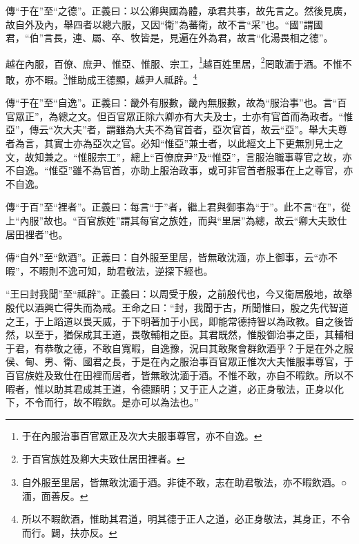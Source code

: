 {\noindent\zhuan{}\fzbyks 傳“于在”至“之德”。正義曰：以公卿與國為體，承君共事，故先言之。然後見廣，故自外及內，舉四者以總六服，又因“衛”為蕃衛，故不言“采”也。“國”謂國君，“伯”言長，連、屬、卒、牧皆是，見遍在外為君，故言“化湯畏相之德”。 \par}

越在內服，百僚、庶尹、惟亞、惟服、宗工，\footnote{于在內服治事百官眾正及次大夫服事尊官，亦不自逸。}越百姓里居，\footnote{于百官族姓及卿大夫致仕居田裡者。}罔敢湎于酒。不惟不敢，亦不暇。\footnote{自外服至里居，皆無敢沈湎于酒。非徒不敢，志在助君敬法，亦不暇飲酒。○湎，面善反。}惟助成王德顯，越尹人祗辟。\footnote{所以不暇飲酒，惟助其君道，明其德于正人之道，必正身敬法，其身正，不令而行。闢，扶亦反。}

{\noindent\zhuan{}\fzbyks 傳“于在”至“自逸”。正義曰：畿外有服數，畿內無服數，故為“服治事”也。言“百官眾正”，為總之文。但百官眾正除六卿亦有大夫及士，士亦有官首而為政者。“惟亞”，傳云“次大夫”者，謂雖為大夫不為官首者，亞次官首，故云“亞”。舉大夫尊者為言，其實士亦為亞次之官。必知“惟亞”兼士者，以此經文上下更無別見士之文，故知兼之。“惟服宗工”，總上“百僚庶尹”及“惟亞”，言服治職事尊官之故，亦不自逸。“惟亞”雖不為官首，亦助上服治政事，或可非官首者服事在上之尊官，亦不自逸。 \par}

{\noindent\zhuan{}\fzbyks 傳“于百”至“裡者”。正義曰：每言“于”者，繼上君與御事為“于”。此不言“在”，從上“內服”故也。“百官族姓”謂其每官之族姓，而與“里居”為總，故云“卿大夫致仕居田裡者”也。 \par}

{\noindent\zhuan{}\fzbyks 傳“自外”至“飲酒”。正義曰：自外服至里居，皆無敢沈湎，亦上御事，云“亦不暇”，不暇則不逸可知，助君敬法，逆探下經也。 \par}

{\noindent\shu{}\fzkt “王曰封我聞”至“祗辟”。正義曰：以周受于殷，之前殷代也，今又衛居殷地，故舉殷代以酒興亡得失而為戒。王命之曰：“封，我聞于古，所聞惟曰，殷之先代智道之王，于上蹈道以畏天威，于下明著加于小民，即能常德持智以為政教。自之後皆然，以至于，猶保成其王道，畏敬輔相之臣。其君既然，惟殷御治事之臣，其輔相于君，有恭敬之德，不敢自寬暇，自逸豫，況曰其敢聚會群飲酒乎？于是在外之服侯、甸、男、衛、國君之長，于是在內之服治事百官眾正惟次大夫惟服事尊官，于百官族姓及致仕在田裡而居者，皆無敢沈湎于酒。不惟不敢，亦自不暇飲。所以不暇者，惟以助其君成其王道，令德顯明；又于正人之道，必正身敬法，正身以化下，不令而行，故不暇飲。是亦可以為法也。” \par}

